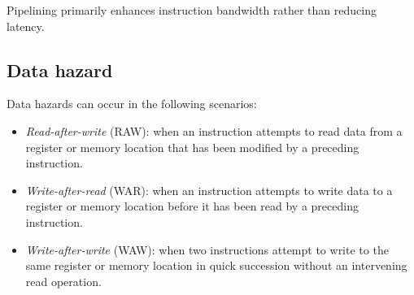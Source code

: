 Pipelining primarily enhances instruction bandwidth rather than reducing latency.

\subsection{Data hazard}
Data hazards can occur in the following scenarios:
\begin{itemize}
    \item \textit{Read-after-write} (RAW): when an instruction attempts to read data from a register or memory location that has been modified by a preceding instruction.
    \item \textit{Write-after-read} (WAR): when an instruction attempts to write data to a register or memory location before it has been read by a preceding instruction.
    \item \textit{Write-after-write} (WAW): when two instructions attempt to write to the same register or memory location in quick succession without an intervening read operation.
\end{itemize}